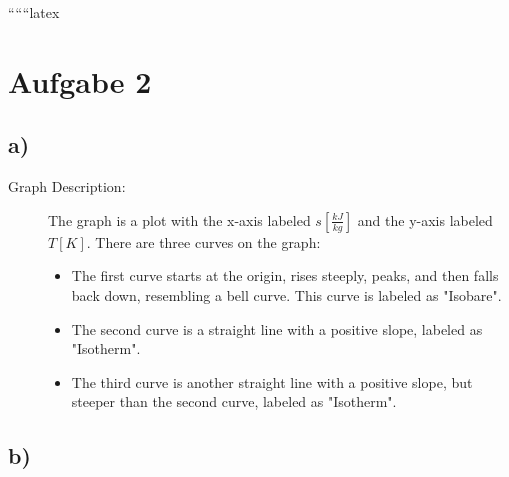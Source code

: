 
``````latex


\section*{Aufgabe 2}

\subsection*{a)}

\begin{description}
    \item[Graph Description:] The graph is a plot with the x-axis labeled \( s \left[ \frac{kJ}{kg} \right] \) and the y-axis labeled \( T [K] \). There are three curves on the graph:
    \begin{itemize}
        \item The first curve starts at the origin, rises steeply, peaks, and then falls back down, resembling a bell curve. This curve is labeled as "Isobare".
        \item The second curve is a straight line with a positive slope, labeled as "Isotherm".
        \item The third curve is another straight line with a positive slope, but steeper than the second curve, labeled as "Isotherm".
    \end{itemize}
\end{description}

\subsection*{b)}

